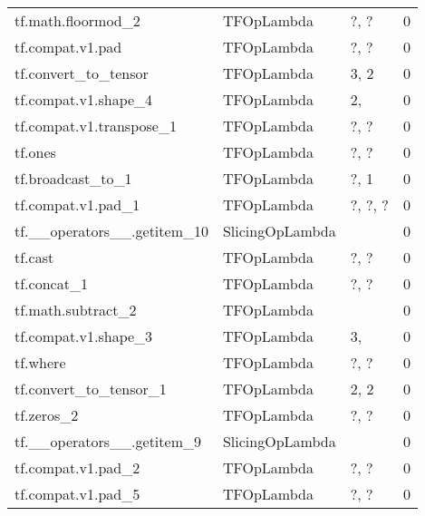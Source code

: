 \begin{longtable}{llll}
         tf.math.floormod\_2 &         TFOpLambda &                             ?, ? &        0 \\
           tf.compat.v1.pad &         TFOpLambda &                             ?, ? &        0 \\
       tf.convert\_to\_tensor &         TFOpLambda &                                   3, 2 &        0 \\
       tf.compat.v1.shape\_4 &         TFOpLambda &                                     2, &        0 \\
   tf.compat.v1.transpose\_1 &         TFOpLambda &                             ?, ? &        0 \\
                    tf.ones &         TFOpLambda &                             ?, ? &        0 \\
          tf.broadcast\_to\_1 &         TFOpLambda &                                ?, 1 &        0 \\
         tf.compat.v1.pad\_1 &         TFOpLambda &                       ?, ?, ? &        0 \\
tf.\_\_operators\_\_.getitem\_10 &    SlicingOpLambda &                                        &        0 \\
                    tf.cast &         TFOpLambda &                             ?, ? &        0 \\
                tf.concat\_1 &         TFOpLambda &                             ?, ? &        0 \\
         tf.math.subtract\_2 &         TFOpLambda &                                        &        0 \\
       tf.compat.v1.shape\_3 &         TFOpLambda &                                     3, &        0 \\
                   tf.where &         TFOpLambda &                             ?, ? &        0 \\
     tf.convert\_to\_tensor\_1 &         TFOpLambda &                                   2, 2 &        0 \\
                 tf.zeros\_2 &         TFOpLambda &                             ?, ? &        0 \\
 tf.\_\_operators\_\_.getitem\_9 &    SlicingOpLambda &                                        &        0 \\
         tf.compat.v1.pad\_2 &         TFOpLambda &                             ?, ? &        0 \\
         tf.compat.v1.pad\_5 &         TFOpLambda &                             ?, ? &        0 \\

\end{longtable}
